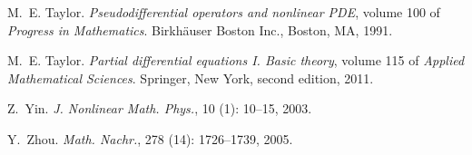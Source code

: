 \documentclass[final,noinfo]{nddiss2e}
\begin{document}
\begin{thebibliography}{35}
M.~E. Taylor.
\newblock \emph{Pseudodifferential operators and nonlinear {PDE}}, volume 100
  of \emph{Progress in Mathematics}.
\newblock Birkh{\"a}user Boston Inc., Boston, MA, 1991.

M.~E. Taylor.
\newblock \emph{Partial differential equations {I}. {B}asic theory}, volume 115
  of \emph{Applied Mathematical Sciences}.
\newblock Springer, New York, second edition, 2011.

Z.~Yin.
\newblock \emph{J. Nonlinear Math. Phys.}, 10 (1): 10--15,
  2003.

Y.~Zhou.
\newblock \emph{Math. Nachr.}, 278 (14): 1726--1739, 2005.

\end{thebibliography}
%
%
\end{document}
